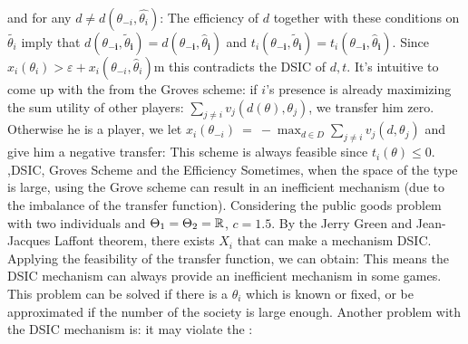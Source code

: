 \documentclass[10pt]{report}
\begin{document}
{{        
        and for any $d\ne d(\theta_{-i},\hat{\theta_i})$:
        The efficiency of $d$ together with these conditions on $\tilde{\theta_i}$ imply that $d(\theta_{-\boldsymbol{i}},\widetilde{\theta}_{\boldsymbol{i}})=d(\theta_{-\boldsymbol{i}},\widehat{\theta}_{\boldsymbol{i}})$ and $t_i(\theta_{-\boldsymbol{i}},\widetilde{\theta}_{\boldsymbol{i}})=t_i(\theta_{-\boldsymbol{i}},\widehat{\theta}_{\boldsymbol{i}})$.
        Since $x_i(\theta_i)>\varepsilon+x_i(\theta_{-i},\widehat{\theta}_i)$m this contradicts the DSIC of $d,t$.
    }
}
It's intuitive to come up with the  from the Groves scheme: if $i$'s presence is already maximizing the sum utility of other players: $\sum_{j\neq i}v_j(d(\theta),\theta_j)$, we transfer him zero. Otherwise he is a  player, we let $x_i(\theta_{-i})~=~-\max_{d\in D}\sum_{j\neq i}v_j(d,\theta_j)$ and give him a negative transfer:
This scheme is always feasible since $t_i(\theta)\le 0$. 
\sep{DSIC, Groves Scheme and the Efficiency}
Sometimes, when the space of the type is large, using the Grove scheme can result in an inefficient mechanism (due to the imbalance of the transfer function). Considering the public goods problem with two individuals and $\Theta_1=\Theta_2=\RR$, $c=1.5$. By the Jerry Green and Jean-Jacques Laffont theorem, there exists $X_i$ that can make a mechanism DSIC. Applying the feasibility of the transfer function, we can obtain: 
This means the DSIC mechanism can always provide an inefficient mechanism in some games. This problem can be solved if there is a $\theta_i$ which is known or fixed, or be approximated if the number of the society is large enough. Another problem with the DSIC mechanism is: it may violate the :
\end{document}

